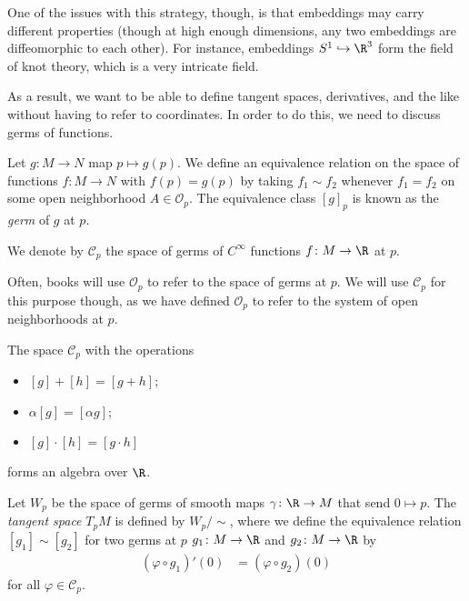 \documentclass[10pt]{mypackage}
\begin{document}
One of the issues with this strategy, though, is that embeddings may carry different properties (though at high enough dimensions, any two embeddings are diffeomorphic to each other). For instance, embeddings $S^{1}\hookrightarrow \R^{3}$ form the field of knot theory, which is a very intricate field.\newline

As a result, we want to be able to define tangent spaces, derivatives, and the like without having to refer to coordinates. In order to do this, we need to discuss germs of functions.
\begin{definition}
  Let $g\colon M\rightarrow N$ map $p\mapsto g(p)$. We define an equivalence relation on the space of functions $f\colon M\rightarrow N$ with $f(p) = g(p)$ by taking $f_1\sim f_2$ whenever $f_1 = f_2$ on some open neighborhood $A\in \mathcal{O}_p$. The equivalence class $\left[ g \right]_p$ is known as the \textit{germ} of $g$ at $p$.\newline

  We denote by $\mathcal{C}_{p}$ the space of germs of $C^{\infty}$ functions $f\colon M\rightarrow \R$ at $p$.
\end{definition}
\begin{remark}
  Often, books will use $\mathcal{O}_p$ to refer to the space of germs at $p$. We will use $\mathcal{C}_p$ for this purpose though, as we have defined $\mathcal{O}_p$ to refer to the system of open neighborhoods at $p$.
\end{remark}
\begin{proposition}
  The space $\mathcal{C}_{p}$ with the operations
  \begin{itemize}
    \item $\left[ g \right] + \left[ h \right] = \left[ g + h \right]$;
    \item $\alpha \left[ g \right] = \left[ \alpha g \right]$;
    \item $\left[ g \right]\cdot \left[ h \right] = \left[ g\cdot h \right]$
  \end{itemize}
  forms an algebra over $\R$.
\end{proposition}
\begin{definition}
  Let $W_p$ be the space of germs of smooth maps $\gamma\colon \R\rightarrow M$ that send $0 \mapsto p$. The \textit{tangent space} $T_pM$ is defined by $W_p/\sim$, where we define the equivalence relation $\left[ g_1 \right]\sim \left[ g_2 \right]$ for two germs at $p$  $g_1\colon M\rightarrow \R$ and $g_2\colon M\rightarrow \R$ by
  \begin{align*}
    \left( \varphi\circ g_1 \right)'(0) &= \left( \varphi\circ g_2 \right)(0)
  \end{align*}
  for all $\varphi\in \mathcal{C}_p$.
\end{definition}
\end{document}
